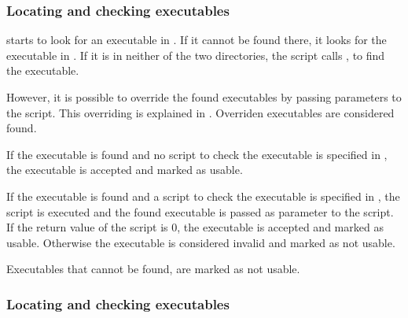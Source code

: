 \subsubsection{Locating and checking executables}

 starts to look for an executable in . If it cannot be found there, it looks for the executable in . If it is in neither of the two directories, the  script calls , to find the executable.

However, it is possible to override the found executables by passing parameters to the  script. This overriding is explained in . Overriden executables are considered found.

If the executable is found and no script to check the executable is specified in , the executable is accepted and marked as usable.

If the executable is found and a script to check the executable is specified in , the script is executed and the found executable is passed as parameter to the script. If the return value of the script is $0$, the executable is accepted and marked as usable.  Otherwise the executable is considered invalid and marked as not usable.

Executables that cannot be found, are marked as not usable.

\subsubsection{Locating and checking executables}

 



